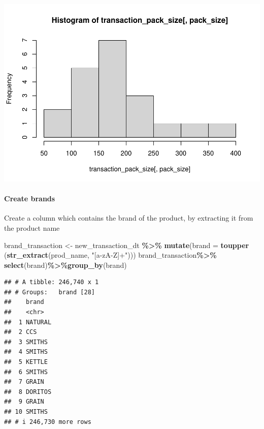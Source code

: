 \documentclass[
]{article}
\newenvironment{Shaded}{\begin{snugshade}}{\end{snugshade}}
\newcommand{\AttributeTok}[1]{\textcolor[rgb]{0.13,0.29,0.53}{#1}}
\newcommand{\FunctionTok}[1]{\textcolor[rgb]{0.13,0.29,0.53}{\textbf{#1}}}
\newcommand{\NormalTok}[1]{#1}
\newcommand{\OtherTok}[1]{\textcolor[rgb]{0.56,0.35,0.01}{#1}}
\newcommand{\SpecialCharTok}[1]{\textcolor[rgb]{0.81,0.36,0.00}{\textbf{#1}}}
\newcommand{\StringTok}[1]{\textcolor[rgb]{0.31,0.60,0.02}{#1}}
\begin{document}
\begin{center}\includegraphics{quantium_analysis_files/figure-latex/unnamed-chunk-21-1} \end{center}

\hypertarget{create-brands}{%
\paragraph{Create brands}\label{create-brands}}

Create a column which contains the brand of the product, by extracting
it from the product name

\begin{Shaded}
\begin{Highlighting}[]
\NormalTok{brand\_transaction }\OtherTok{\textless{}{-}}\NormalTok{ new\_transaction\_dt }\SpecialCharTok{\%\textgreater{}\%}
  \FunctionTok{mutate}\NormalTok{(}\AttributeTok{brand =} \FunctionTok{toupper}\NormalTok{ (}\FunctionTok{str\_extract}\NormalTok{(prod\_name, }\StringTok{"[a{-}zA{-}Z]+"}\NormalTok{)))}
\NormalTok{brand\_transaction}\SpecialCharTok{\%\textgreater{}\%} \FunctionTok{select}\NormalTok{(brand)}\SpecialCharTok{\%\textgreater{}\%}\FunctionTok{group\_by}\NormalTok{(brand)}
\end{Highlighting}
\end{Shaded}

\begin{verbatim}
## # A tibble: 246,740 x 1
## # Groups:   brand [28]
##    brand  
##    <chr>  
##  1 NATURAL
##  2 CCS    
##  3 SMITHS 
##  4 SMITHS 
##  5 KETTLE 
##  6 SMITHS 
##  7 GRAIN  
##  8 DORITOS
##  9 GRAIN  
## 10 SMITHS 
## # i 246,730 more rows
\end{verbatim}
\end{document}
